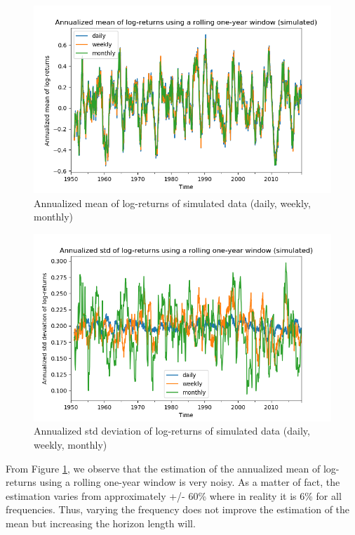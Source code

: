\documentclass[10pt]{article}
\newenvironment{exercise}[2][Exercise]{\begin{trivlist}
  \item[\hskip \labelsep {\bfseries #1}\hskip \labelsep {\bfseries #2.}]}{\end{trivlist}}
\begin{document}
\begin{exercise}{3}
	\begin{figure}[H]
	
		\centering
		\includegraphics[scale=0.5]{Figures/problem3d_mean.png}	
		\caption{Annualized mean of log-returns of simulated data (daily, weekly, monthly)}	
		\label{fig:problem3d_mean}
	
	\end{figure}
	
	\begin{figure}[H]
	
		\centering
		\includegraphics[scale=0.5]{Figures/problem3d_std.png}	
		\caption{Annualized std deviation of log-returns of simulated data (daily, weekly, monthly)}	
		\label{fig:problem3d_std}
	
	\end{figure}
	
	From Figure \ref{fig:problem3d_mean}, we observe that the estimation of the annualized mean of log-returns using a rolling one-year window is very noisy. As a matter of fact, the estimation varies from approximately +/- 60\% where in reality it is 6\% for all frequencies. Thus, varying the frequency does not improve the estimation of the mean but increasing the horizon length  will. 
	

\end{exercise}
\end{document}
